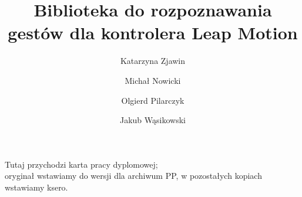 \documentclass[english,bachelor,a4paper,oneside]{ppfcmthesis}
\author{%
   Katarzyna Zjawin \album{xxx} \and 
   Michał Nowicki \album{95883} \and 
   Olgierd Pilarczyk \album{xxx} \and 
   Jakub Wąsikowski \album{xxx}}
\title{Biblioteka do rozpoznawania gestów dla kontrolera Leap Motion}        %
\begin{document}
\frontmatter\pagestyle{empty}%
\maketitle\cleardoublepage%

\thispagestyle{empty}\vspace*{\fill}%
\begin{center}Tutaj przychodzi karta pracy dyplomowej;\\oryginał wstawiamy do wersji dla archiwum PP, w pozostałych kopiach wstawiamy ksero.\end{center}%
\vfill\cleardoublepage%

\pagestyle{ppfcmthesis}%
\tableofcontents* \cleardoublepage%

\mainmatter%





\cleardoublepage\appendix%
%

{\raggedright\sloppy\small}

\ppcolophon
\end{document}
